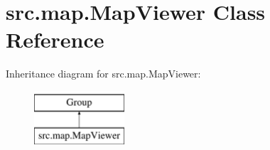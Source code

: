 \hypertarget{classsrc_1_1map_1_1_map_viewer}{}\section{src.\+map.\+Map\+Viewer Class Reference}
\label{classsrc_1_1map_1_1_map_viewer}
Inheritance diagram for src.\+map.\+Map\+Viewer\+:\begin{figure}[H]
\begin{center}
\leavevmode
\includegraphics[height=2.000000cm]{classsrc_1_1map_1_1_map_viewer}
\end{center}
\end{figure}
